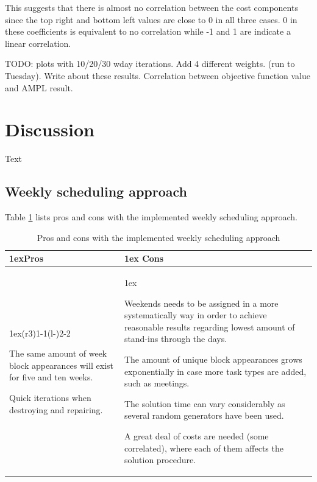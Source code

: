  This suggests that there is almost no correlation between the cost components since the top right and bottom left values are close to 0 in all three cases. 0 in these coefficients is equivalent to no correlation while -1 and 1 are indicate a linear correlation. 
 
TODO: plots with 10/20/30 wday iterations. Add 4 different weights. (run to Tuesday).
Write about these results. Correlation between objective function value and AMPL result.

\section{Discussion}
Text


\subsection{Weekly scheduling approach}
Table \ref{pros_cons_weekly_scheduling} lists pros and cons with the implemented weekly scheduling approach.
\begin{table}[!h]
\caption{Pros and cons with the implemented weekly scheduling approach}
\label{pros_cons_weekly_scheduling}
\begin{tabularx}{\linewidth}{>{\parskip1ex}X@{\kern4\tabcolsep}>{\parskip1ex}X}
\toprule
\hfil\bfseries Pros
&
\hfil\bfseries Cons
\\\cmidrule(r{3\tabcolsep}){1-1}\cmidrule(l{-\tabcolsep}){2-2}

The same amount of week block appearances will exist for five and ten weeks.\par
Quick iterations when destroying and repairing.\par

&

Weekends needs to be assigned in a more systematically way in order to achieve reasonable results regarding lowest amount of stand-ins through the days.\par
The amount of unique block appearances grows exponentially in case more task types are added, such as meetings.\par
The solution time can vary considerably as several random generators have been used.\par
A great deal of costs are needed (some correlated), where each of them affects the solution procedure.

\\\bottomrule
\end{tabularx}
\end{table}

